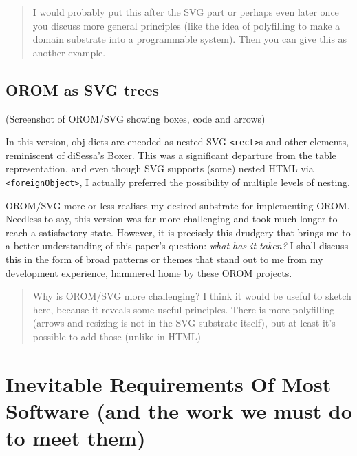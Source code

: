 \documentclass[english,submission]{programming}
\begin{document}
  \begin{quote}
  I would probably put this after the SVG part or perhaps even later once
  you discuss more general principles (like the idea of polyfilling to
  make a domain substrate into a programmable system). Then you can give
  this as another example.
  \end{quote}

  \hypertarget{orom-as-svg-trees}{%
  \subsection{OROM as SVG trees}\label{orom-as-svg-trees}}

  (Screenshot of OROM/SVG showing boxes, code and arrows)

  In this version, obj-dicts are encoded as nested SVG
  \texttt{\textless{}rect\textgreater{}}s and other elements, reminiscent
  of diSessa's Boxer. This was a significant departure from the table
  representation, and even though SVG supports (some) nested HTML via
  \texttt{\textless{}foreignObject\textgreater{}}, I actually preferred
  the possibility of multiple levels of nesting.

  OROM/SVG more or less realises my desired substrate for implementing
  OROM. Needless to say, this version was far more challenging and took
  much longer to reach a satisfactory state. However, it is precisely this
  drudgery that brings me to a better understanding of this paper's
  question: \emph{what has it taken?} I shall discuss this in the form of
  broad patterns or themes that stand out to me from my development
  experience, hammered home by these OROM projects.

  \begin{quote}
  Why is OROM/SVG more challenging? I think it would be useful to sketch
  here, because it reveals some useful principles. There is more
  polyfilling (arrows and resizing is not in the SVG substrate itself),
  but at least it's possible to add those (unlike in HTML)
  \end{quote}

  \hypertarget{inevitable-requirements-of-most-software-and-the-work-we-must-do-to-meet-them}{%
  \section{Inevitable Requirements Of Most Software (and the work we
  must do to meet
  them)}\label{inevitable-requirements-of-most-software-and-the-work-we-must-do-to-meet-them}}
\end{document}
